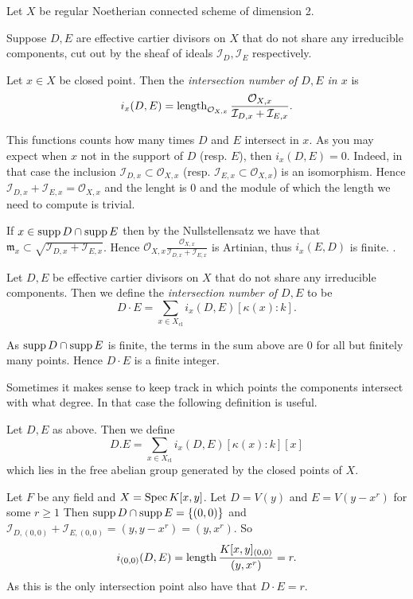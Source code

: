 
Let $X$ be regular Noetherian connected scheme of dimension 2. 
\begin{definition}
	Suppose $D, E$ are effective cartier divisors on $X$ that do not share any irreducible components, cut out by the sheaf of ideals $\mathcal{I} _D, \mathcal{I} _E$ respectively.

	Let $x \in X$ be closed point. Then the \emph{intersection number of $D, E$ in $x$} is \[
		i_x(D, E) = \operatorname{length}_{\mathcal{O}_{X, x}} \frac{\mathcal{O}_{X, x}}{\mathcal{I}_{D,x} + \mathcal{I}_{E,x}} 
	.\]  
\end{definition}

This functions counts how many times $ D$ and $E$ intersect in $x$. 
As you may expect when  $x$ not in the support of $D$ (resp. $E$), then $i_x(D, E) = 0$. 
Indeed, in that case the inclusion $\mathcal{I}_{D, x} \subset  \mathcal{O}_{X, x}$ (resp. $\mathcal{I} _{E, x}\subset \mathcal{O}_{X,x}$) is an isomorphism. 
Hence $\mathcal{I}_{D, x} + \mathcal{I} _{E, x} = \mathcal{O}_{X, x}$ and the lenght is $0$ and the module of which the length we need to compute is trivial. 

If $x \in \operatorname{supp} D \cap \operatorname{supp} E$ then by the Nullstellensatz we have that $\mathfrak{m} _x \subset  \sqrt{\mathcal{I} _{D, x} + \mathcal{I} _{E, x}} $. 
Hence ${\mathcal{O}_{X, x}} \frac{\mathcal{O}_{X, x}}{\mathcal{I}_{D,x} + \mathcal{I}_{E,x}}$ is Artinian, thus $i_x(E, D)$ is finite. 
. 

\begin{definition}\label{def:intersection_number_effective}
	Let $D, E$ be effective cartier divisors on $X$ that do not share any irreducible components.
	Then we define the \emph{intersection number of $D, E$} to be \[
		D\cdot E = \sum_{x \in X_\text{cl} }i_x (D, E)[\kappa(x): k]
	.\] 
\end{definition}
As $\operatorname{supp} D \cap \operatorname{supp} E$ is finite, the terms in the sum above are $0$ for all but finitely many points. Hence $D\cdot E$ is a finite integer. 

Sometimes it makes sense to keep track in which points the components intersect with what degree. In that case the following definition is useful. 
\begin{definition}
	Let $D, E$ as above. 
	Then we define \[
		D.E = \sum_{x \in X_\text{cl} } i_x(D, E)[\kappa(x) :k] [x]
	\] 
	which lies in the free abelian group generated by the closed points of $X$.
\end{definition}
\begin{example}
	Let $F$ be any field and $X = \operatorname{Spec} K[x, y]$. 
	Let  $D = V(y)$ and $E = V(y - x^r)$ for some $r \ge 1$
	Then  $\operatorname{supp} D \cap \operatorname{supp} E = \{(0, 0)\} $ and $\mathcal{I} _{D, (0,0)} + \mathcal{I} _{E, (0,0)} = (y, y-x^r) = (y, x^r)$.
	So \[
		i_{(0,0)}(D, E) = \operatorname{length} \frac{K[x, y]_{(0, 0)}}{(y, x^{r})} = r
	.\] 
	As this is the only intersection point also have that $D\cdot E = r$. 
\end{example}

